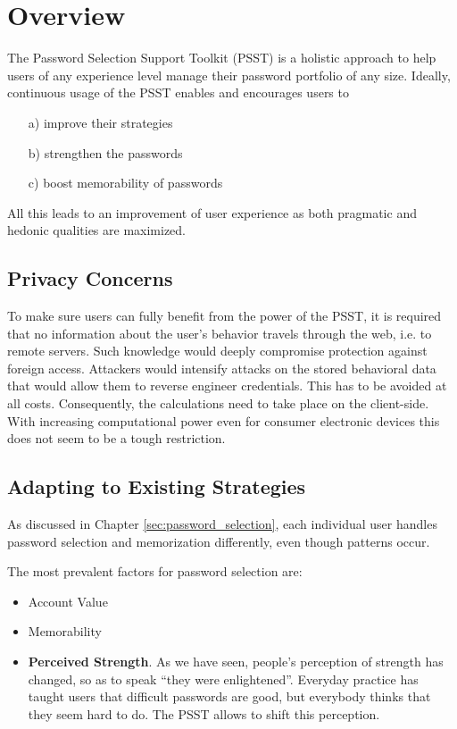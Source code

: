 
\chapter[Overview]{Overview}\label{chap:psst_overview}

The Password Selection Support Toolkit (PSST) is a holistic approach to help users of any experience level manage their password portfolio of any size. Ideally, continuous usage of the PSST enables and encourages users to 
\begin{enumerate}
\item[a)] improve their strategies
\item[b)] strengthen the passwords
\item[c)] boost memorability of passwords
\end{enumerate}
All this leads to an improvement of user experience as both pragmatic and hedonic qualities are maximized. 

\section{Privacy Concerns}
To make sure users can fully benefit from the power of the PSST, it is required that no information about the user's behavior travels through the web, i.e. to remote servers. Such knowledge would deeply compromise protection against foreign access. Attackers would intensify attacks on the stored behavioral data that would allow them to reverse engineer credentials. This has to be avoided at all costs. Consequently, the calculations need to take place on the client-side. With increasing computational power even for consumer electronic devices this does not seem to be a tough restriction. 

\section{Adapting to Existing Strategies}
As discussed in Chapter \ref{sec:password_selection}, each individual user handles password selection and memorization differently, even though patterns occur. 

The most prevalent factors for password selection are:
\begin{itemize}
\item Account Value
\item Memorability
\item \textbf{Perceived Strength}. As we have seen, people's perception of strength has changed, so as to speak ``they were enlightened''. Everyday practice has taught users that difficult passwords are good, but everybody thinks that they seem hard to do. The PSST allows to shift this perception. 
\end{itemize}

